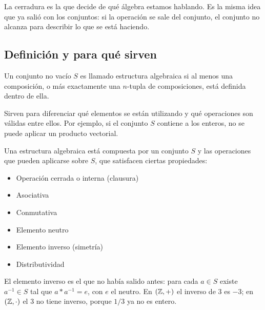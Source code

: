 \documentclass[11pt,letterpaper]{article}
\begin{document}
\begin{idea}
    La cerradura es la que decide de qué álgebra estamos hablando. Es
    la misma idea que ya salió con los conjuntos: si la operación se
    sale del conjunto, el conjunto no alcanza para describir lo que se
    está haciendo.
\end{idea}

\newpage



\subsection*{Definición y para qué sirven}

\begin{definicion}
    Un conjunto no vacío $S$ es llamado estructura algebraica si al
    menos una composición, o más exactamente una $n$-tupla de
    composiciones, está definida dentro de ella.
\end{definicion}

Sirven para diferenciar qué elementos se están utilizando y qué
operaciones son válidas entre ellos. Por ejemplo, si el conjunto $S$
contiene a los enteros, no se puede aplicar un producto vectorial.

Una estructura algebraica está compuesta por un conjunto $S$ y las
operaciones que pueden aplicarse sobre $S$, que satisfacen ciertas
propiedades:

\begin{itemize}[itemsep=0.05em]
    \item Operación cerrada o interna (clausura)
    \item Asociativa
    \item Conmutativa
    \item Elemento neutro
    \item Elemento inverso (simetría)
    \item Distributividad
\end{itemize}

El elemento inverso es el que no había salido antes: para cada
$a \in S$ existe $a^{-1} \in S$ tal que $a * a^{-1} = e$, con $e$ el
neutro. En $(\mathbb{Z}, +)$ el inverso de $3$ es $-3$; en $(\mathbb{Z}, \cdot)$ el
$3$ no tiene inverso, porque $1/3$ ya no es entero.
\end{document}
